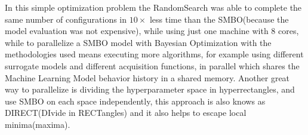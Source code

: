 \documentclass[12pt, onecolumn]{article}
\begin{document}
In this simple optimization problem the RandomSearch was able to complete the same number of configurations in $10\times$ less time than the SMBO(because the model evaluation was not expensive), while using just one machine with 8 cores, while to parallelize a SMBO model with Bayesian Optimization with the methodologies used means executing more algorithms, for example using different surrogate models and different acquisition functions, in parallel which shares the Machine Learning Model behavior history in a shared memory.
Another great way to parallelize is dividing the hyperparameter space in hyperrectangles, and use SMBO on each space independently, this approach is also knows as DIRECT(DIvide in RECTangles) and it also helps to escape local minima(maxima).
\end{document}
